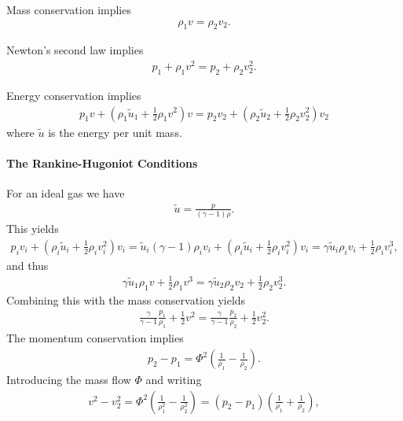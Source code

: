 Mass conservation implies
\begin{align*}
	\rho_{1}v = \rho_{2}v_{2}.
\end{align*}

Newton's second law implies
\begin{align*}
	p_{1} + \rho_{1}v^{2} = p_{2} + \rho_{2}v_{2}^{2}.
\end{align*}

Energy conservation implies
\begin{align*}
	p_{1}v + \left(\rho_{1}\tilde{u}_{1} + \frac{1}{2}\rho_{1}v^{2}\right)v = p_{2}v_{2} + \left(\rho_{2}\tilde{u}_{2} + \frac{1}{2}\rho_{2}v_{2}^{2}\right)v_{2}
\end{align*}
where $\tilde{u}$ is the energy per unit mass.

\paragraph{The Rankine-Hugoniot Conditions}
For an ideal gas we have
\begin{align*}
	\tilde{u} = \frac{p}{(\gamma - 1)\rho}.
\end{align*}
This yields
\begin{align*}
	p_{i}v_{i} + \left(\rho_{i}\tilde{u}_{i} + \frac{1}{2}\rho_{i}v_{i}^{2}\right)v_{i} = \tilde{u}_{i}(\gamma - 1)\rho_{i}v_{i} + \left(\rho_{i}\tilde{u}_{i} + \frac{1}{2}\rho_{i}v_{i}^{2}\right)v_{i} = \gamma\tilde{u}_{i}\rho_{i}v_{i} + \frac{1}{2}\rho_{i}v_{i}^{3},
\end{align*}
and thus
\begin{align*}
	\gamma\tilde{u}_{1}\rho_{1}v + \frac{1}{2}\rho_{1}v^{3} = \gamma\tilde{u}_{2}\rho_{2}v_{2} + \frac{1}{2}\rho_{2}v_{2}^{3}.
\end{align*}
Combining this with the mass conservation yields
\begin{align*}
	\frac{\gamma}{\gamma - 1}\frac{p_{1}}{\rho_{1}} + \frac{1}{2}v^{2} = \frac{\gamma}{\gamma - 1}\frac{p_{2}}{\rho_{2}} + \frac{1}{2}v_{2}^{2}.
\end{align*}
The momentum conservation implies
\begin{align*}
	p_{2} - p_{1} = \Phi^{2}\left(\frac{1}{\rho_{1}} - \frac{1}{\rho_{2}}\right).
\end{align*}
Introducing the mass flow $\Phi$ and writing
\begin{align*}
	v^{2} - v_{2}^{2} = \Phi^{2}\left(\frac{1}{\rho_{1}^{2}} - \frac{1}{\rho_{2}^{2}}\right) = (p_{2} - p_{1})\left(\frac{1}{\rho_{1}} + \frac{1}{\rho_{2}}\right),
\end{align*}
